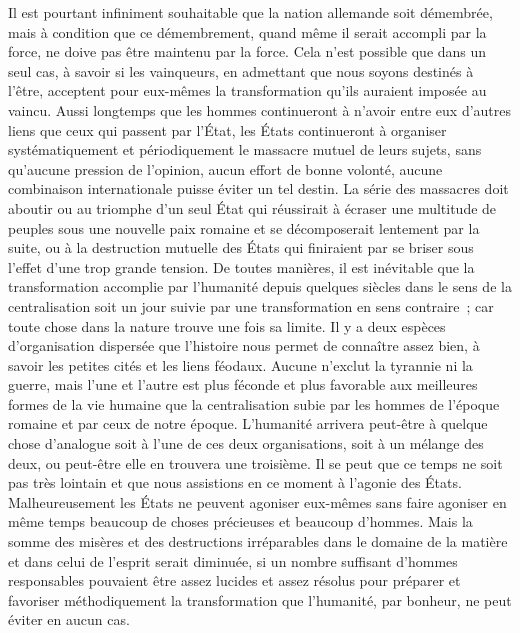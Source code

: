 \documentclass[french,twoside]{book} %
\begin{document}
Il est pourtant infiniment souhaitable que la nation allemande soit démem­brée, mais à condition que ce démembrement, quand même il serait accompli par la force, ne doive pas être maintenu par la force. Cela n'est possible que dans un seul cas, à savoir si les vainqueurs, en admettant que nous soyons destinés à l'être, acceptent pour eux-mêmes la transformation qu'ils auraient imposée au vaincu. Aussi longtemps que les hommes continueront à n'avoir entre eux d'autres liens que ceux qui passent par l'État, les États continueront à organiser systématiquement et périodiquement le massacre mutuel de leurs sujets, sans qu'aucune pression de l'opinion, aucun effort de bonne volonté, aucune combinaison internationale puisse éviter un tel destin. La série des massacres doit aboutir ou au triomphe d'un seul État qui réussirait à écraser une multitude de peuples sous une nouvelle paix romaine et se décomposerait lentement par la suite, ou à la destruction mutuelle des États qui finiraient par se briser sous l'effet d'une trop grande tension. De toutes manières, il est inévitable que la transformation accomplie par l'humanité depuis quelques siècles dans le sens de la centralisation soit un jour suivie par une transfor­mation en sens contraire ; car toute chose dans la nature trouve une fois sa limite. Il y a deux espèces d'organisation dispersée que l'histoire nous permet de connaître assez bien, à savoir les petites cités et les liens féodaux. Aucune n'exclut la tyrannie ni la guerre, mais l'une et l'autre est plus féconde et plus favorable aux meilleures formes de la vie humaine que la centralisation subie par les hommes de l'époque romaine et par ceux de notre époque. L'humanité arrivera peut-être à quelque chose d'analogue soit à l'une de ces deux organisations, soit à un mélange des deux, ou peut-être elle en trouvera une troisième. Il se peut que ce temps ne soit pas très lointain et que nous assis­tions en ce moment à l'agonie des États. Malheureusement les États ne peuvent agoniser eux-mêmes sans faire agoniser en même temps beaucoup de choses précieuses et beaucoup d'hommes. Mais la somme des misères et des destructions irréparables dans le domaine de la matière et dans celui de l'esprit serait diminuée, si un nombre suffisant d'hommes responsables pouvaient être assez lucides et assez résolus pour préparer et favoriser méthodiquement la transformation que l'humanité, par bonheur, ne peut éviter en aucun cas.\par

\begin{center}
\end{center}
\end{document}
